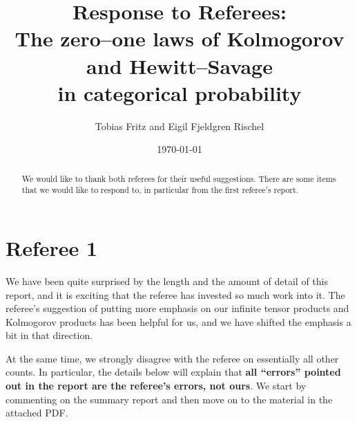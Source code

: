 \documentclass[11pt]{article}
\author{Tobias Fritz and Eigil Fjeldgren Rischel}
\title{Response to Referees:\\ The zero--one laws of Kolmogorov and Hewitt--Savage\\ in categorical probability}
\date{\today}
\begin{document}
\maketitle

\begin{abstract}
	We would like to thank both referees for their useful suggestions. There are some items that we would like to respond to, in particular from the first referee's report.
\end{abstract}

\section*{Referee 1}

We have been quite surprised by the length and the amount of detail of this report, and it is exciting that the referee has invested so much work into it. The referee's suggestion of putting more emphasis on our infinite tensor products and Kolmogorov products has been helpful for us, and we have shifted the emphasis a bit in that direction.

At the same time, we strongly disagree with the referee on essentially all other counts. In particular, the details below will explain that \textbf{all ``errors'' pointed out in the report are the referee's errors, not ours}. We start by commenting on the summary report and then move on to the material in the attached PDF.
\end{document}
